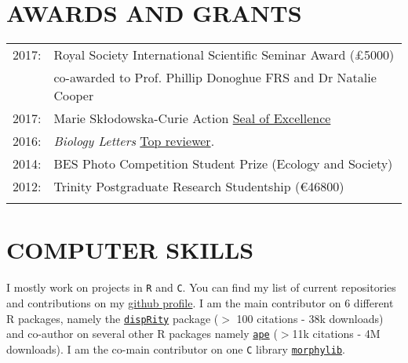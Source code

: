 \documentclass[10pt,a4paper]{article}
\begin{document}
{\bigskip




\section{AWARDS AND GRANTS}
\begin{tabular}{ll}
2017: & Royal Society International Scientific Seminar Award (\pounds5000)\\
      & co-awarded to Prof. Phillip Donoghue FRS and Dr Natalie Cooper\\
2017: & Marie Sk\l{}odowska-Curie Action \href{https://ec.europa.eu/research/soe/index.cfm?pg=what}{Seal of Excellence}\\
2016: & \textit{Biology Letters} \href{http://blogs.royalsociety.org/publishing/biology-letters-top-reviewers-from-2016/}{Top reviewer}.\\
2014: & BES Photo Competition Student Prize (Ecology and Society)\\
2012: & Trinity Postgraduate Research Studentship (\euro46800)\\
& \\ 
\end{tabular}
\bigskip


\section{COMPUTER SKILLS}

I mostly work on projects in \texttt{R} and \texttt{C}. You can find my list of current repositories and contributions on my \href{https://github.com/tguillerme}{github profile}. I am the main contributor on 6 different R packages, namely the \href{https://github.com/tguillerme/dispRity}{\texttt{dispRity}} package ($>$ 100 citations - 38k downloads) and co-author on several other R packages namely \href{https://github.com/emmanuelparadis/ape}{\texttt{ape}} ($>$11k citations - 4M downloads). I am the co-main contributor on one \texttt{C} library \href{https://github.com/mbrazeau/morphylib}{\texttt{morphylib}}.

}
\end{document}

